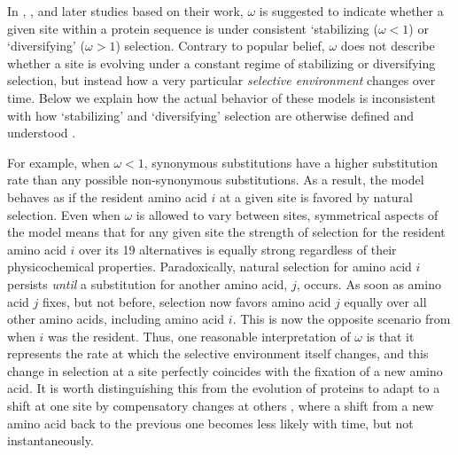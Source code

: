 \documentclass[onecolumn,letterpaper,fleqn,nogrid]{myMBE}%
\newcommand{\PC}{physicochemical\xspace}
\begin{document}
In \citet{GoldmanAndYang1994}, \citet{YangAndNielsen1998} ,\citet{NielsenAndYang1998} and later studies based on their work, $\omega$ is suggested to indicate whether a given site within a protein sequence is under consistent `stabilizing ($\omega < 1$) or `diversifying' ($\omega > 1$) selection.
Contrary to popular belief, $\omega$ does not describe whether a site is evolving under a constant regime of stabilizing or diversifying selection, but instead how a very particular \emph{selective environment} changes over time.
Below we explain how the actual behavior of these models is inconsistent with how `stabilizing' and `diversifying' selection are otherwise defined and understood \citep[e.g.~see][]{Pellmyr2002}. %

For example, when $\omega < 1$, synonymous substitutions have a higher substitution rate than any possible non-synonymous substitutions.
As a result, the model behaves as if the resident amino acid $i$ at a given site is favored by natural selection.
Even when $\omega$ is allowed to vary between sites, symmetrical aspects of the model means that for any given site the strength of selection for the resident amino acid $i$ over its 19 alternatives is equally strong regardless of their \PC properties.
Paradoxically, natural selection for amino acid $i$ persists \emph{until} a substitution for another amino acid, $j$, occurs.
As soon as amino acid $j$ fixes, but not before, selection now favors amino acid $j$ equally over all other amino acids, including amino acid $i$.
This is now the opposite scenario from when $i$ was the resident.
Thus, one reasonable interpretation of $\omega$ is that it represents the rate at which the selective environment itself changes, and this change in selection at a site perfectly coincides with the fixation of a new amino acid.
It is worth distinguishing this from the evolution of proteins to adapt to a shift at one site by compensatory changes at others \citep{ShahEtAl2015,PollockEtAl2012}, where a shift from a new amino acid back to the previous one becomes less likely with time, but not instantaneously.
\end{document}

